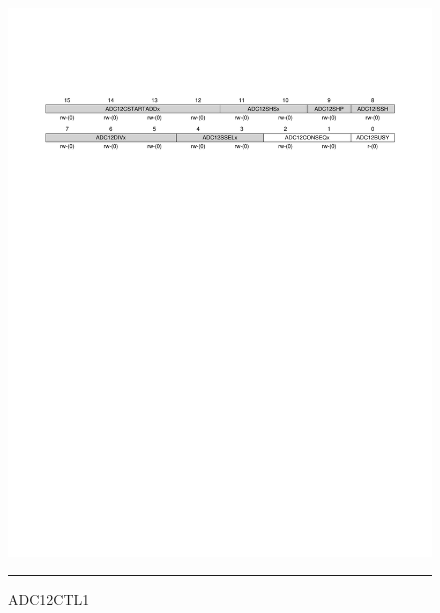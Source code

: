 \pagebreak
\begin{figure}[H]
  \centering
  \includegraphics [angle=0, width=16cm]{./Figures/Chap11_ADC/ADC12CTL1.pdf}
  \rule{35em}{0.5pt}
  \caption{ADC12CTL1}
  \label{fig:ADC12CTL1}
\end{figure}

